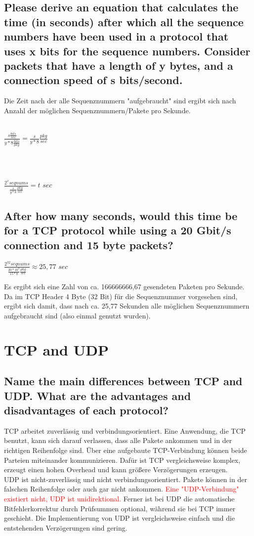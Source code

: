 \documentclass[a4paper,
			llpt,
			solution,
			accentcolor=tud2d,
			colorbacktitle
			]
			{tudexercise}
\begin{document}
\subsection{Please derive an equation that calculates the time (in seconds) after which all the sequence numbers have been used in a protocol that uses x bits for the sequence numbers. Consider packets that have a length of y bytes, and a connection speed of s bits/second.}
Die Zeit nach der alle Sequenznummern "aufgebraucht" sind ergibt sich nach Anzahl der möglichen Sequenznummern/Pakete pro Sekunde.
\\\\
\centerline{
$
    \frac{s \frac{bits}{sec}}{y*8\frac{bits}{pkg}} = \frac{s}{y*8} \frac{pkg}{sec}
$
}
\\
\\

\centerline{
$\frac{2^x seqnums}{\frac{s}{y*8} \frac{pkg}{sec}} = t$ $sec$
}
\subsection{After how many seconds, would this time be for a TCP protocol while using a 20 Gbit/s connection and 15 byte packets?}
\centerline{
$\frac{2^{32} seqnums}{\frac{20*10^9}{15*8} \frac{pkg}{sec}} \approx 25,77$ $sec$
}

Es ergibt sich eine Zahl von ca. 166666666,67 gesendeten Paketen pro Sekunde. Da im TCP Header 4 Byte (32 Bit) für die Sequenznummer vorgesehen sind, ergibt sich damit, dass nach ca. 25,77 Sekunden alle möglichen Sequenznummern aufgebraucht sind (also einmal genutzt wurden).
\section{TCP and UDP}
\subsection{Name the main differences between TCP and UDP. What are the advantages and disadvantages of each protocol?}
TCP arbeitet zuverlässig und verbindungsorientiert. Eine Anwendung, die TCP benutzt, kann sich darauf verlassen, dass alle Pakete ankommen und in der richtigen Reihenfolge sind. Über eine aufgebaute TCP-Verbindung können beide Parteien miteinander kommunizieren. Dafür ist TCP vergleichsweise komplex, erzeugt einen hohen Overhead und kann größere Verzögerungen erzeugen. \\
UDP ist nicht-zuverlässig und nicht verbindungsorientiert. Pakete können in der falschen Reihenfolge oder auch gar nicht ankommen. \textcolor{red}{Eine "UDP-Verbindung" existiert nicht, UDP ist unidirektional.} Ferner ist bei UDP die automatische Bitfehlerkorrektur durch Prüfsummen optional, während sie bei TCP immer geschieht. Die Implementierung von UDP ist vergleichsweise einfach und die entstehenden Verzögerungen sind gering.
\end{document}
